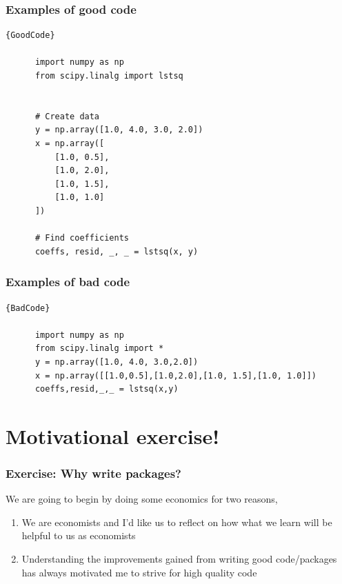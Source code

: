 \documentclass[10pt]{beamer}
\begin{document}
  \begin{frame}[fragile] \frametitle{Examples of good code}

      \begin{lstlisting}{GoodCode}

      import numpy as np
      from scipy.linalg import lstsq


      # Create data
      y = np.array([1.0, 4.0, 3.0, 2.0])
      x = np.array([
          [1.0, 0.5],
          [1.0, 2.0],
          [1.0, 1.5],
          [1.0, 1.0]
      ])

      # Find coefficients
      coeffs, resid, _, _ = lstsq(x, y)

      \end{lstlisting}

  \end{frame}

  \begin{frame}[fragile] \frametitle{Examples of bad code}

      \begin{lstlisting}{BadCode}

      import numpy as np
      from scipy.linalg import *
      y = np.array([1.0, 4.0, 3.0,2.0])
      x = np.array([[1.0,0.5],[1.0,2.0],[1.0, 1.5],[1.0, 1.0]])
      coeffs,resid,_,_ = lstsq(x,y)

      \end{lstlisting}

  \end{frame}



\section{Motivational exercise!}

  \begin{frame} \frametitle{Exercise: Why write packages?}

    We are going to begin by doing some economics for two reasons,

    \begin{enumerate}
      \item We are economists and I'd like us to reflect on how what we learn will be helpful to us
            as economists
      \item Understanding the improvements gained from writing good code/packages has always
            motivated me to strive for high quality code
    \end{enumerate}

  \end{frame}
\end{document}
